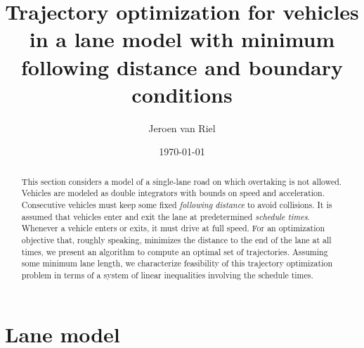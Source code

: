 \documentclass[a4paper]{article}
\author{Jeroen van Riel}
\date{\monthyeardate\today}
\title{Trajectory optimization for vehicles in a lane model with minimum
  following distance and boundary conditions}
\theoremstyle{definition}
\theoremstyle{plain}
\begin{document}
\maketitle

\begin{abstract}
  This section considers a model of a single-lane road on which overtaking is
  not allowed.
  Vehicles are modeled as double integrators with bounds on speed and
  acceleration. Consecutive vehicles must keep some fixed \textit{following
    distance} to avoid collisions.
  It is assumed that vehicles enter and exit the lane at
  predetermined \textit{schedule times}. Whenever a vehicle enters or exits, it
  must drive at full speed.
  For an optimization objective that, roughly speaking, minimizes the distance
  to the end of the lane at all times, we present an algorithm to compute an
  optimal set of trajectories.
  Assuming some minimum lane length, we characterize feasibility of this
  trajectory optimization problem in terms of a system of linear inequalities
  involving the schedule times.
\end{abstract}

\newcommand\halfopen[2]{\ensuremath{[#1,#2)}}
\newcommand\openhalf[2]{\ensuremath{(#1,#2]}}

\renewcommand{\labelitemii}{\textbullet}
\renewcommand{\labelitemiii}{\textbullet}

\section{Lane model}
\end{document}
